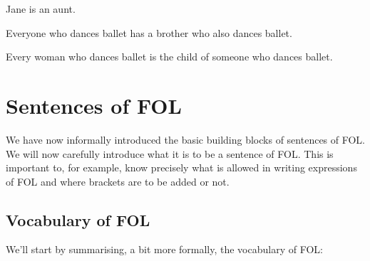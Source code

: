 \begin{practiceproblems}
\begin{problemslist}
		\item Jane is an aunt.
		\item[] 
		\item Everyone who dances ballet has a brother who also dances ballet.
		\item[] 
		\item Every woman who dances ballet is the child of someone who dances ballet.
		\item[] 
	\end{problemslist}
	
	
	
\end{practiceproblems}

\chapter{Sentences of FOL}\label{sec:FOLSentences}

We have now informally introduced the basic building blocks of sentences of FOL. We will now carefully introduce what it is to be a sentence of FOL. This is important to, for example, know precisely what is allowed in writing expressions of FOL and where brackets are to be added or not. 


\section{Vocabulary of FOL}
We'll start by summarising, a bit more formally, the vocabulary of FOL:

